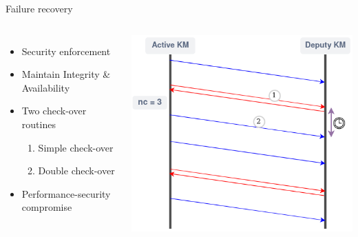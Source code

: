 \documentclass{beamer}
\begin{document}
\begin{frame}{Failure recovery}
	\begin{columns}
		\begin{itemize}
			\item Security enforcement
			\item Maintain Integrity \& Availability
			\item Two check-over routines
			\begin{enumerate}
				\item Simple check-over
				\item Double check-over
			\end{enumerate}
			\item Performance-security compromise
		\end{itemize}
		\includegraphics[width=\linewidth]{figures/check_routine_min.png}
	\end{columns}
\end{frame}
\end{document}
